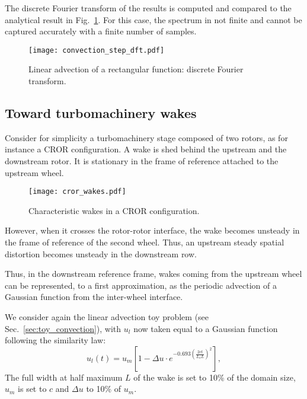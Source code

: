 The discrete Fourier transform of the results
is computed and compared to the analytical result in Fig.~\ref{fig:dft_step}.
For this case, the spectrum in not finite and cannot be captured accurately
with a finite number of samples.

\begin{figure}[htb]
  \centering
  \texttt{[image: convection\_step\_dft.pdf]}
  \caption{Linear advection of a rectangular function: 
  discrete Fourier transform.}
  \label{fig:dft_step}
\end{figure}

\FloatBarrier

\subsection{Toward turbomachinery wakes}
\label{sec:turbomachine_wake}

Consider for simplicity a turbomachinery stage composed of two rotors,
as for instance a CROR configuration.
A wake is shed behind
the upstream and the downstream rotor. 
It is stationary in the frame of reference attached to the upstream wheel.
\begin{figure}[htb]
    \centering\texttt{[image: cror\_wakes.pdf]}
  \caption{Characteristic wakes in a CROR configuration.}
  \label{fig:rotor-stator}
\end{figure}
However, when it crosses the rotor-rotor interface,
the wake becomes unsteady in the frame of reference of the second wheel. 
Thus, an upstream steady spatial distortion becomes unsteady in
the downstream row.

Thus, in the downstream reference frame, wakes coming 
from the upstream wheel can be represented, 
to a first approximation, as the periodic 
advection of a Gaussian function from the inter-wheel interface.

We consider again the linear advection toy problem (see Sec.~\ref{sec:toy_convection}), 
with $u_l$ now taken equal to a Gaussian function following the
\citet{Lakshminarayana1980} similarity law:
\begin{equation}
    u_l (t) = u_m \left[1 - 
        \Delta u \cdot e^{
          -0.693 \left(\frac{2 c t}{L_x L} \right) ^ 2}\right],
\end{equation}
The full width at half maximum $L$ of the wake is set to 10\% of the domain size, 
$u_m$ is set to $c$ and $\Delta u$ to 10\% of $u_m$.

